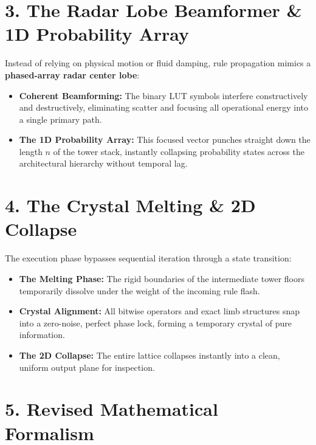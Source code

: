 \medskip

\section{\texorpdfstring{3. The Radar Lobe Beamformer \& 1D Probability Array}{3. The Radar Lobe Beamformer \& 1D Probability Array}}

Instead of relying on physical motion or fluid damping, rule propagation mimics a \textbf{phased-array radar center lobe}:

\begin{itemize}
\item \textbf{Coherent Beamforming:} The binary LUT symbols interfere constructively and destructively, eliminating scatter and focusing all operational energy into a single primary path.
\item \textbf{The 1D Probability Array:} This focused vector punches straight down the length \(n\) of the tower stack, instantly collapsing probability states across the architectural hierarchy without temporal lag.
\end{itemize}

\medskip

\section{\texorpdfstring{4. The Crystal Melting \& 2D Collapse}{4. The Crystal Melting \& 2D Collapse}}

The execution phase bypasses sequential iteration through a state transition:

\begin{itemize}
\item \textbf{The Melting Phase:} The rigid boundaries of the intermediate tower floors temporarily dissolve under the weight of the incoming rule flash.
\item \textbf{Crystal Alignment:} All bitwise operators and exact limb structures snap into a zero-noise, perfect phase lock, forming a temporary crystal of pure information.
\item \textbf{The 2D Collapse:} The entire lattice collapses instantly into a clean, uniform output plane for inspection.
\end{itemize}

\medskip

\section{\texorpdfstring{5. Revised Mathematical Formalism}{5. Revised Mathematical Formalism}}


